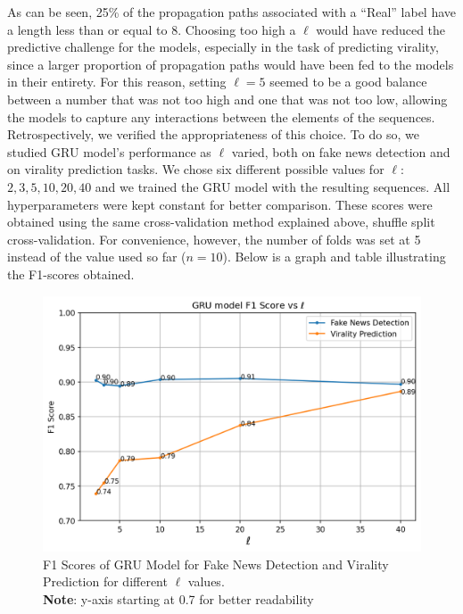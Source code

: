 \documentclass[a4paper,twoside,12pt]{book}
\begin{document}
As can be seen, 25\% of the propagation paths associated with a “Real” label have a length less than or equal to 8. Choosing too high a $\ell$ would have reduced the predictive challenge for the models, especially in the task of predicting virality, since a larger proportion of propagation paths would have been fed to the models in their entirety. For this reason, setting $\ell=5$ seemed to be a good balance between a number that was not too high and one that was not too low, allowing the models to capture any interactions between the elements of the sequences. Retrospectively, we verified the appropriateness of this choice. To do so, we studied GRU model's performance as $\ell$ varied, both on fake news detection and on virality prediction tasks. We chose six different possible values for $\ell$: $2, 3, 5, 10, 20, 40$ and we trained the GRU model with the resulting sequences. All hyperparameters were kept constant for better comparison. These scores were obtained using the same cross-validation method explained above, shuffle split cross-validation. For convenience, however, the number of folds was set at 5 instead of the value used so far ($n=10$). Below is a graph and table illustrating the F1-scores obtained.

\pagebreak

\begin{figure}[h!]
	\centering
	\includegraphics[width=\textwidth]{./img/gru_model_f1_score_vs_l.png}
	\caption{F1 Scores of GRU Model for Fake News Detection and Virality Prediction for different $\ell$ values. \\ \textbf{Note}: y-axis starting at 0.7 for better readability}
\end{figure}
\end{document}
